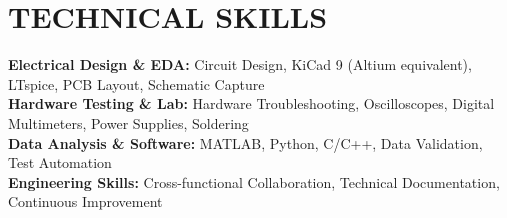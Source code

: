 \documentclass[letterpaper,11pt]{article}
\begin{document}
\section{TECHNICAL SKILLS}
 \begin{itemize}[leftmargin=0.15in, label={}]
    \small{\item{
     \textbf{Electrical Design \& EDA:} Circuit Design, KiCad 9 (Altium equivalent), LTspice, PCB Layout, Schematic Capture \\
     \textbf{Hardware Testing \& Lab:} Hardware Troubleshooting, Oscilloscopes, Digital Multimeters, Power Supplies, Soldering \\
     \textbf{Data Analysis \& Software:} MATLAB, Python, C/C++, Data Validation, Test Automation \\
     \textbf{Engineering Skills:} Cross-functional Collaboration, Technical Documentation, Continuous Improvement
    }}
 \end{itemize}


\end{document}
